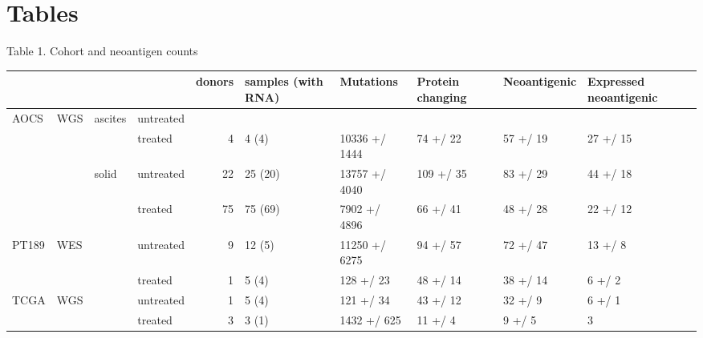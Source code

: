 \section{Tables}

Table 1. Cohort and neoantigen counts


\begin{tabular}{llllrlllll}
\toprule
     &     &         &         &  donors & samples (with RNA) &      Mutations & Protein changing & Neoantigenic & Expressed neoantigenic \\
\midrule
AOCS & WGS & ascites & untreated &         &                    &                &                  &              &                        \\
     &     &         & treated &       4 &              4 (4) &  10336 +/ 1444 &         74 +/ 22 &     57 +/ 19 &               27 +/ 15 \\
     &     & solid & untreated &      22 &            25 (20) &  13757 +/ 4040 &        109 +/ 35 &     83 +/ 29 &               44 +/ 18 \\
     &     &         & treated &      75 &            75 (69) &   7902 +/ 4896 &         66 +/ 41 &     48 +/ 28 &               22 +/ 12 \\
PT189 & WES &         & untreated &       9 &             12 (5) &  11250 +/ 6275 &         94 +/ 57 &     72 +/ 47 &                13 +/ 8 \\
     &     &         & treated &       1 &              5 (4) &      128 +/ 23 &         48 +/ 14 &     38 +/ 14 &                 6 +/ 2 \\
TCGA & WGS &         & untreated &       1 &              5 (4) &      121 +/ 34 &         43 +/ 12 &      32 +/ 9 &                 6 +/ 1 \\
     &     &         & treated &       3 &              3 (1) &    1432 +/ 625 &          11 +/ 4 &       9 +/ 5 &                      3 \\
\bottomrule
\end{tabular}